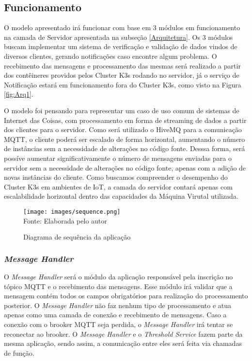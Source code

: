 \subsection{Funcionamento}

O modelo apresentado irá funcionar com base em 3 módulos em funcionamento na camada de Servidor apresentada na subseção \ref{Arquitetura}. 
Os 3 módulos buscam implementar um sistema de verificação e validação de dados vindos de diversos clientes, gerando notificações caso encontre algum problema. 
O recebimento das mensagens e processamento das mesmas será realizado a partir dos contêineres providos pelos Cluster K3s rodando no servidor, já o serviço de Notificação estará em funcionamento fora do Cluster K3s, como visto na Figura \ref{fig:Arq1}.

O modelo foi pensando para representar um caso de uso comum de sistemas de Internet das Coisas, com processamento em forma de streaming de dados a partir dos clientes para o servidor.
Como será utilizado o HiveMQ para a comunicação MQTT, o cliente poderá ser escalado de forma horizontal, aumentando o número de instâncias sem a necessidade de alterações no código fonte.
Desssa forma, será possíve aumentar significativamente o número de mensagens enviadas para o servidor sem a necessidade de alterações no código fonte, apenas com a adição de novas instâncias do cliente.
Como buscamos compreender o desempenho do Cluster K3s em ambientes de IoT, a camada do servidor contará apenas com escalabilidade horizontal dentro das capacidades da Máquina Virutal utilizada.

\begin{figure}[H]
    \centering
    \caption{Diagrama de sequência da aplicação}
    \texttt{[image: images/sequence.png]}\\
 Fonte: Elaborada pelo autor
    \label{fig:enter-label}
\end{figure}

\subsubsection{\textit{Message Handler}}

O \textit{Message Handler} será o módulo da aplicação responsável pela inscrição no tópico MQTT e o recebimento das mensagens. 
Esse módulo irá validar que a mensagem contém todos os campos obrigatórios para realização do processamento posterior. 
O \textit{Message Handler} não faz nenhum tipo de processamento e atua apenas como uma camada de conexão e recebimento de mensagens.
Caso a conexão com o brooker MQTT seja perdida, o \textit{Message Handler} irá tentar se reconectar ao brooker.
O \textit{Message Handler} e o \textit{Threshold Service} fazem parte da mesma aplicação, sendo assim, a comunicação entre eles será feita via chamadas de função.

